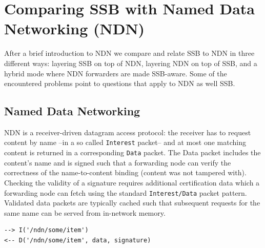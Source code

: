\documentclass[9pt,sigconf,rewiew]{acmart}
\begin{document}



\section{Comparing SSB with Named Data Networking (NDN)}
\label{sect:NDN}

After a brief introduction to NDN we compare and relate SSB to NDN in
three different ways: layering SSB on top of NDN, layering NDN on top
of SSB, and a hybrid mode where NDN forwarders are made SSB-aware.
Some of the encountered problems point to questions that apply to NDN
as well SSB.

\subsection{Named Data Networking}

NDN is a receiver-driven datagram access protocol: the receiver has to
request content by name --in a so called {\tt Interest} packet-- and
at most one matching content is returned in a corresponding {\tt Data}
packet. The Data packet includes the content's name and is signed such
that a forwarding node can verify the correctness of the
name-to-content binding (content was not tampered with). Checking the validity of a signature requires
additional certification data which a forwarding node can fetch using
the standard {\tt Interest/Data} packet pattern. Validated data
packets are typically cached such that subsequent requests for the
same name can be served from in-network memory.

\begin{verbatim}
--> I('/ndn/some/item')
<-- D('/ndn/some/item', data, signature)
\end{verbatim}
\end{document}
